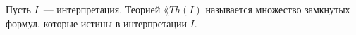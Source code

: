 Пусть $I$~--- интерпретация. Теорией $\lang{Th}(I)$ называется множество замкнутых формул, которые истины в интерпретации
$I$.
